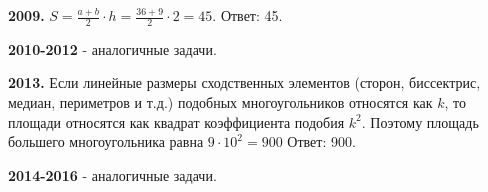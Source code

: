 \textbf{2009.} $S = \frac{a+b}{2}\cdot h = \frac{36+9}{2}\cdot 2=45.$ \newline \null \hspace*{\fill} Ответ: 45.

\textbf{2010-2012} - аналогичные задачи.

\textbf{2013.} Если линейные размеры сходственных элементов (сторон, биссектрис, медиан, периметров и т.д.) подобных многоугольников относятся как $k$, то площади относятся как квадрат коэффициента подобия $k^2$. Поэтому площадь большего многоугольника равна $9\cdot10^2=900$ \newline \null \hspace*{\fill} Ответ: 900.

\textbf{2014-2016} - аналогичные задачи.